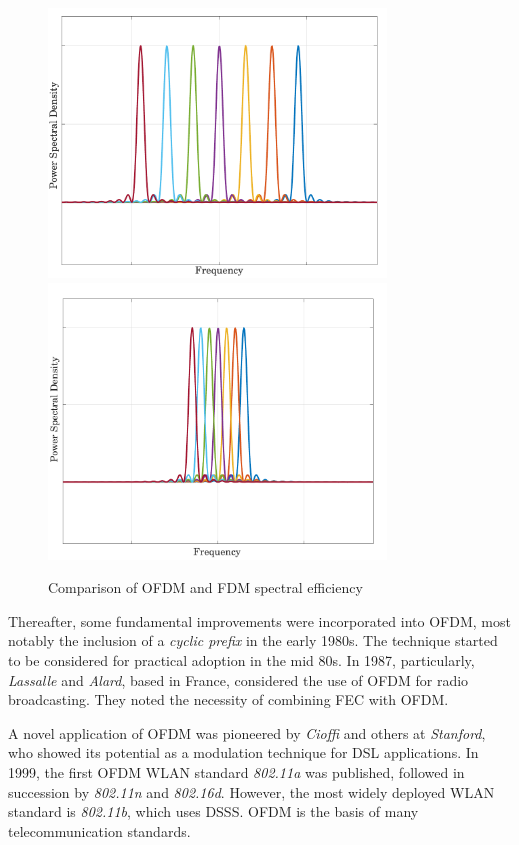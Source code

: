\begin{figure}[!ht]
	\centering
	\includegraphics[width=0.8\textwidth]{Graphics/LiteratureReview/fdm.pdf}
	\includegraphics[width=0.8\textwidth]{Graphics/LiteratureReview/ofdmPSD.pdf}
	\caption{Comparison of OFDM and FDM spectral efficiency}
	\label{fig:litRev:fdm}
\end{figure}

Thereafter, some fundamental improvements were incorporated into OFDM, most notably the inclusion of a \emph{cyclic prefix} in the early 1980s. The technique started to be considered for practical adoption in the mid 80s. In 1987, particularly, \emph{Lassalle} and \emph{Alard}, based in France, considered the use of OFDM for radio broadcasting. They noted the necessity of combining \gls{FEC} with \gls{OFDM}.

A novel application of OFDM was pioneered by \emph{Cioffi} and others at \emph{Stanford}, who showed its potential as a modulation technique for \gls{DSL} applications. In 1999, the first OFDM \gls{WLAN} standard \emph{802.11a} was published, followed in succession by \emph{802.11n} and \emph{802.16d}. However, the most widely deployed \gls{WLAN} standard is \emph{802.11b}, which uses \gls{DSSS}. OFDM is the basis of many telecommunication standards.

